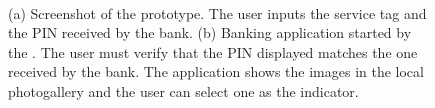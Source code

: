 \begin{figure}[!t]
  \centering
  ~
  \caption[\secmodule{} and the Banking application started by it]{
  (a) Screenshot of the \secmodule{} prototype. The user inputs the service tag and the PIN received by the bank.
  (b) Banking application started by the \secmodule{}. The user must verify that the PIN displayed matches the one received by the bank.
  The application shows the images in the local photogallery and the user can select one as the indicator.}
\end{figure}

